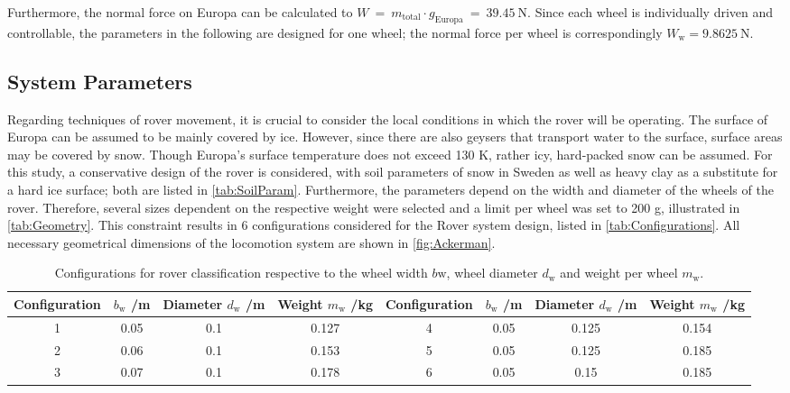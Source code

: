 Furthermore, the normal force on Europa can be calculated to \( W \:  = \:	m_\text{total} \cdot g_\text{Europa} \:  = \: 39.45 ~ \text{N} \). Since each wheel is individually driven and controllable, the parameters in the following are designed for one wheel; the normal force per wheel is correspondingly \(W_\text{w} = 9.8625 ~ \text{N}\).

\subsection{System Parameters}
\label{sec:SystemParametersLoco}

Regarding techniques of rover movement, it is crucial to consider the local conditions in which the rover will be operating. The surface of Europa can be assumed to be mainly covered by ice. However, since there are also geysers that transport water to the surface, surface areas may be covered by snow. Though Europa's surface temperature does not exceed 130 K, rather icy, hard-packed snow can be assumed. For this study, a conservative design of the rover is considered, with soil parameters of snow in Sweden as well as heavy clay as a substitute for a hard ice surface; both are listed in \autoref{tab:SoilParam}. Furthermore, the parameters depend on the width and diameter of the wheels of the rover. Therefore, several sizes dependent on the respective weight were selected and a limit per wheel was set to 200 g, illustrated in \autoref{tab:Geometry}. This constraint results in 6 configurations considered for the Rover system design, listed in \autoref{tab:Configurations}. All necessary geometrical dimensions of the locomotion system are shown in \autoref{fig:Ackerman}.

\begin{table}[htb]
\centering
\caption{Configurations for rover classification respective to the wheel width \(b\text{w}\), wheel diameter \(d_\text{w}\) and weight per wheel \(m_\text{w}\).}
\begin{adjustbox}{max width=\textwidth}
\begin{tabular}{cccc|cccc}

	\toprule
		\multicolumn{1}{l}{Configuration} & \multicolumn{1}{c}{\(b_\text{w}\) /m} & \multicolumn{1}{c}{Diameter \(d_\text{w}\) /m} & \multicolumn{1}{c|}{Weight \(m_\text{w}\) /kg} &  \multicolumn{1}{l}{Configuration} & \multicolumn{1}{c}{\(b_\text{w}\) /m} & \multicolumn{1}{c}{Diameter \(d_\text{w}\) /m} & \multicolumn{1}{c}{Weight \(m_\text{w}\) /kg}  \\

	\midrule
		
		1	&	0.05	&	0.1		&	0.127		& 	4	&	0.05	&	0.125	&	0.154	\\
		2	&	0.06	&	0.1		&	0.153		&	5	&	0.05	&	0.125	&	0.185	\\
		3	&	0.07	&	0.1		&	0.178		& 	6	&	0.05	&	0.15	&	0.185	\\

	\bottomrule
	
\end{tabular}
\end{adjustbox}
\label{tab:Configurations}
\end{table}



